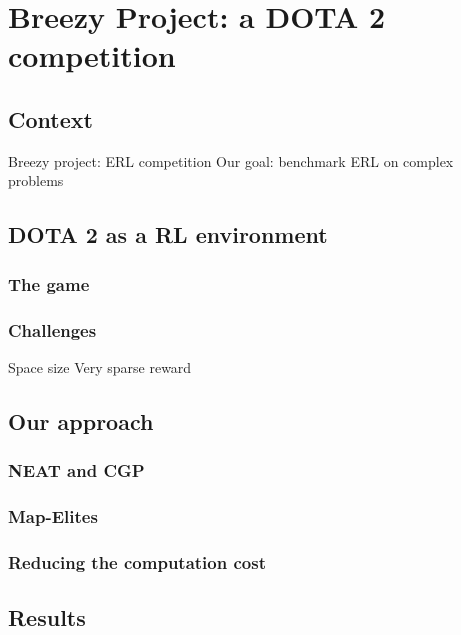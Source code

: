 \chapter{Breezy Project: a DOTA 2 competition}
\label{sec:dota}

\section{Context}
Breezy project: ERL competition
Our goal: benchmark ERL on complex problems

\section{DOTA 2 as a RL environment}
\subsection{The game}

\subsection{Challenges}
Space size
Very sparse reward


\section{Our approach}
\subsection{NEAT and CGP}
\subsection{Map-Elites}
\subsection{Reducing the computation cost}

\section{Results}

